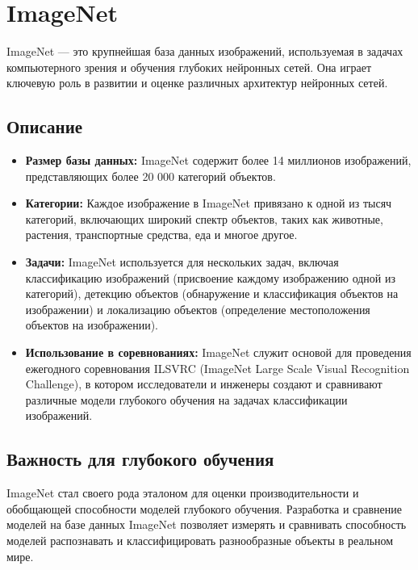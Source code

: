\documentclass{article}
\theoremstyle{definition}
\theoremstyle{theorem}
\theoremstyle{remark}
\theoremstyle{theorem}
\theoremstyle{example}
\theoremstyle{theorem}
\theoremstyle{theorem}
\theoremstyle{theorem}
\theoremstyle{theorem}
\begin{document}
	\section{ImageNet}
	
	ImageNet — это крупнейшая база данных изображений, используемая в задачах компьютерного зрения и обучения глубоких нейронных сетей. Она играет ключевую роль в развитии и оценке различных архитектур нейронных сетей.
	
	\subsection{Описание}
	
	\begin{itemize}
		\item \textbf{Размер базы данных:} ImageNet содержит более 14 миллионов изображений, представляющих более 20 000 категорий объектов.
		
		\item \textbf{Категории:} Каждое изображение в ImageNet привязано к одной из тысяч категорий, включающих широкий спектр объектов, таких как животные, растения, транспортные средства, еда и многое другое.
		
		\item \textbf{Задачи:} ImageNet используется для нескольких задач, включая классификацию изображений (присвоение каждому изображению одной из категорий), детекцию объектов (обнаружение и классификация объектов на изображении) и локализацию объектов (определение местоположения объектов на изображении).
		
		\item \textbf{Использование в соревнованиях:} ImageNet служит основой для проведения ежегодного соревнования ILSVRC (ImageNet Large Scale Visual Recognition Challenge), в котором исследователи и инженеры создают и сравнивают различные модели глубокого обучения на задачах классификации изображений.
	\end{itemize}
	
	\subsection{Важность для глубокого обучения}
	
	ImageNet стал своего рода эталоном для оценки производительности и обобщающей способности моделей глубокого обучения. Разработка и сравнение моделей на базе данных ImageNet позволяет измерять и сравнивать способность моделей распознавать и классифицировать разнообразные объекты в реальном мире.
	
\end{document}
